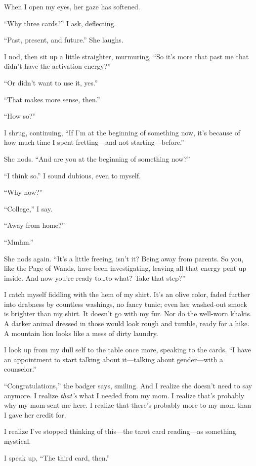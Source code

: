 When I open my eyes, her gaze has softened.

``Why three cards?'' I ask, deflecting.

``Past, present, and future.'' She laughs.

I nod, then sit up a little straighter, murmuring, ``So it's more that past me that didn't have the activation energy?''

``Or didn't want to use it, yes.''

``That makes more sense, then.''

``How so?''

I shrug, continuing, ``If I'm at the beginning of something now, it's because of how much time I spent fretting---and not starting---before.''

She nods. ``And are you at the beginning of something now?''

``I think so.'' I sound dubious, even to myself.

``Why now?''

``College,'' I say.

``Away from home?''

``Mmhm.''

She nods again. ``It's a little freeing, isn't it? Being away from parents. So you, like the Page of Wands, have been investigating, leaving all that energy pent up inside. And now you're ready to\ldots{}to what? Take that step?''

I catch myself fiddling with the hem of my shirt. It's an olive color, faded further into drabness by countless washings, no fancy tunic; even her washed-out smock is brighter than my shirt. It doesn't go with my fur. Nor do the well-worn khakis. A darker animal dressed in those would look rough and tumble, ready for a hike. A mountain lion looks like a mess of dirty laundry.

I look up from my dull self to the table once more, speaking to the cards. ``I have an appointment to start talking about it---talking about gender---with a counselor.''

``Congratulations,'' the badger says, smiling. And I realize she doesn't need to say anymore. I realize \emph{that's} what I needed from my mom. I realize that's probably why my mom sent me here. I realize that there's probably more to my mom than I gave her credit for.

I realize I've stopped thinking of this---the tarot card reading---as something mystical.

I speak up, ``The third card, then.''

